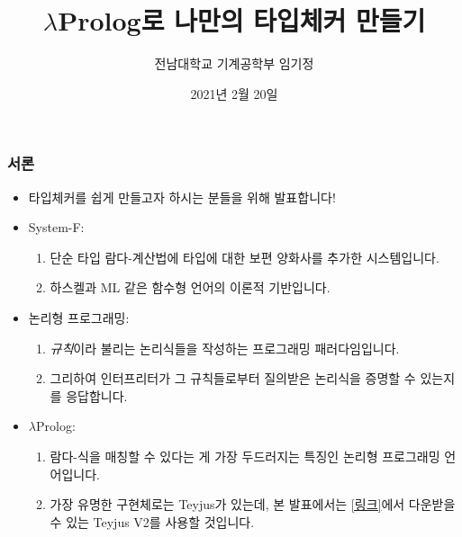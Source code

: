 \documentclass[slidestop,compress,mathserif]{beamer}
\title{$\lambda$Prolog로 나만의 타입체커 만들기}
\author{전남대학교 기계공학부 임기정}
\date{2021년 2월 20일}
\begin{document}
    \begin{frame}
        \maketitle
    \end{frame}

    \begin{frame}
        \frametitle{서론}
        \begin{itemize}
            \item 타입체커를 쉽게 만들고자 하시는 분들을 위해 발표합니다!
            \pause
            \item System-F:
            \begin{enumerate}
                \item 단순 타입 람다-계산법에 타입에 대한 보편 양화사를 추가한 시스템입니다.
                \item 하스켈과 ML 같은 함수형 언어의 이론적 기반입니다.
            \end{enumerate}
            \pause
            \item 논리형 프로그래밍:
            \begin{enumerate}
                \item \textit{규칙}이라 불리는 논리식들을 작성하는 프로그래밍 패러다임입니다.
                \item 그리하여 인터프리터가 그 규칙들로부터 질의받은 논리식을 증명할 수 있는지를 응답합니다.
            \end{enumerate}
            \pause
            \item $\lambda$Prolog:
            \begin{enumerate}
                \item 람다-식을 매칭할 수 있다는 게 가장 두드러지는 특징인 논리형 프로그래밍 언어입니다.
                \item 가장 유명한 구현체로는 Teyjus가 있는데, 본 발표에서는 \href{https://github.com/teyjus/teyjus/releases}{[링크]}에서 다운받을 수 있는 Teyjus V2를 사용할 것입니다.
            \end{enumerate}
        \end{itemize}
    \end{frame}
    
\end{document}
